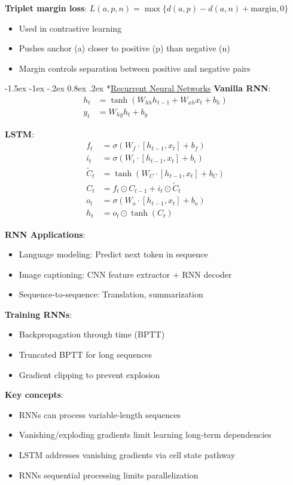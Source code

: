 \documentclass{article}
\makeatletter
\renewcommand\section{\@startsection{section}{1}{\z@}%
                                  {-1.5ex \@plus -1ex \@minus -.2ex}%
                                  {0.8ex \@plus.2ex}%
                                  {\normalfont\small\bfseries}}
\makeatother
\begin{document}
\begin{multicols}{3}
\textbf{Triplet margin loss}: $L(a,p,n) = \max\{d(a,p) - d(a,n) + \text{margin}, 0\}$
\begin{itemize}
\item Used in contrastive learning
\item Pushes anchor (a) closer to positive (p) than negative (n)
\item Margin controls separation between positive and negative pairs
\end{itemize}

\section*{\underline{Recurrent Neural Networks}}
\textbf{Vanilla RNN}:
\begin{align*}
h_t &= \tanh(W_{hh}h_{t-1} + W_{xh}x_t + b_h)\\
y_t &= W_{hy}h_t + b_y
\end{align*}

\textbf{LSTM}:
\begin{align*}
f_t &= \sigma(W_f \cdot [h_{t-1}, x_t] + b_f)\\
i_t &= \sigma(W_i \cdot [h_{t-1}, x_t] + b_i)\\
\tilde{C}_t &= \tanh(W_C \cdot [h_{t-1}, x_t] + b_C)\\
C_t &= f_t \odot C_{t-1} + i_t \odot \tilde{C}_t\\
o_t &= \sigma(W_o \cdot [h_{t-1}, x_t] + b_o)\\
h_t &= o_t \odot \tanh(C_t)
\end{align*}

\textbf{RNN Applications}:
\begin{itemize}
\item Language modeling: Predict next token in sequence
\item Image captioning: CNN feature extractor + RNN decoder
\item Sequence-to-sequence: Translation, summarization
\end{itemize}

\textbf{Training RNNs}:
\begin{itemize}
\item Backpropagation through time (BPTT)
\item Truncated BPTT for long sequences
\item Gradient clipping to prevent explosion
\end{itemize}

\textbf{Key concepts}:
\begin{itemize}
\item RNNs can process variable-length sequences
\item Vanishing/exploding gradients limit learning long-term dependencies
\item LSTM addresses vanishing gradients via cell state pathway
\item RNNs sequential processing limits parallelization
\end{itemize}


\end{multicols}
\end{document}
